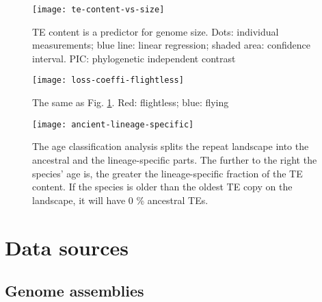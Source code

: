 \begin{figure}
\centering
\texttt{[image: te-content-vs-size]}
\caption[TE content is a predictor for genome size]{TE content is a predictor for genome size. Dots: individual measurements; blue line: linear regression; shaded area: confidence interval. PIC: phylogenetic independent contrast \citep{Felsenstein1985}}
\label{fig:te-content-vs-size}
\end{figure}

\begin{figure}[h!]
\centering
\texttt{[image: loss-coeffi-flightless]}
\caption[TE content is a predictor for genome size, irrespective of flight ability]{The same as Fig. \ref{fig:te-content-vs-size}. Red: flightless; blue: flying}
\label{fig:loss-coefficient-plots-flight}
\end{figure}

\begin{figure}[h!]
\centering
\texttt{[image: ancient-lineage-specific]}
\caption[TE age classification explanation]{The age classification analysis splits the repeat landscape into the ancestral and the lineage-specific parts. The further to the right the species' age is, the greater the lineage-specific fraction of the TE content. If the species is older than the oldest TE copy on the landscape, it will have 0 \% ancestral TEs.}
\label{fig:ancient-lineage-specific}
\end{figure}

\clearpage

\section{Data sources}

\subsection{Genome assemblies}

